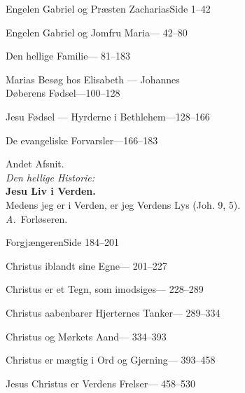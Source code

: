 \documentclass[12pt,a4paper]{book}
\begin{document}
\begingroup
\setlength{\parindent}{0pt}
Engelen Gabriel og Præsten Zacharias\dotfill Side 1--42\par
{}Engelen Gabriel og Jomfru Maria\dotfill --- 42--80\par
{}Den hellige Familie\dotfill --- 81--183\par
\hspace*{2.6em}Marias Besøg hos Elisabeth --- Johannes\\
\hspace*{4.4em}Døberens Fødsel\dotfill ---100--128\par
\hspace*{2.6em}Jesu Fødsel --- Hyrderne i Bethlehem\dotfill ---128--166\par
\hspace*{2.6em}De evangeliske Forvarsler\dotfill ---166--183\par
\endgroup

\begin{center}
  {\large Andet Afsnit.}\\[6pt]
  \emph{Den hellige Historie:}\\[4pt]
  \textbf{\large Jesu Liv i Verden.}\\[6pt]
  {\footnotesize Medens jeg er i Verden, er jeg Verdens Lys (Joh. 9, 5).}\\[8pt]
  \textit{A.}\ Forløseren.
\end{center}

\begingroup
\setlength{\parindent}{0pt}
Forgjængeren\dotfill Side 184--201\par
{}Christus iblandt sine Egne\dotfill --- 201--227\par
{}Christus er et Tegn, som imodsiges\dotfill --- 228--289\par
{}Christus aabenbarer Hjerternes Tanker\dotfill --- 289--334\par
{}Christus og Mørkets Aand\dotfill --- 334--393\par
{}Christus er mægtig i Ord og Gjerning\dotfill --- 393--458\par
{}Jesus Christus er Verdens Frelser\dotfill --- 458--530\par
\endgroup

\end{document}
